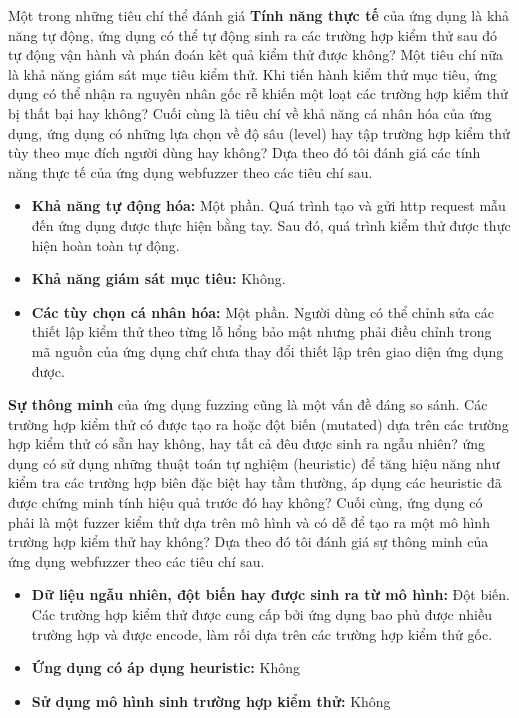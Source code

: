 Một trong những tiêu chí thể đánh giá \textbf{Tính năng thực tế} của ứng dụng là khả năng tự động, ứng dụng có thể tự động sinh ra các trường hợp kiểm thử sau đó tự động vận hành và phán đoán kêt quả kiểm thử được không? Một tiêu chí nữa là khả năng giám sát mục tiêu kiểm thử. Khi tiến hành kiểm thử mục tiêu, ứng dụng có thể nhận ra nguyên nhân gốc rễ khiến một loạt các trường hợp kiểm thử bị thất bại hay không? Cuối cùng là tiêu chí về khả năng cá nhân hóa của ứng dụng, ứng dụng có những lựa chọn về độ sâu (level) hay tập trường hợp kiểm thử tùy theo mục đích người dùng hay không? Dựa theo đó tôi đánh giá các tính năng thực tế của ứng dụng webfuzzer theo các tiêu chí sau.
\begin{itemize}
    \item \textbf{Khả năng tự động hóa:} Một phần. Quá trình tạo và gửi \acrshort{http} request mẫu đến ứng dụng được thực hiện bằng tay. Sau đó, quá trình kiểm thử được thực hiện hoàn toàn tự động.
    \item \textbf{Khả năng giám sát mục tiêu:} Không.
    \item \textbf{Các tùy chọn cá nhân hóa:} Một phần. Người dùng có thể chỉnh sửa các thiết lập kiểm thử theo từng lỗ hổng bảo mật nhưng phải điều chỉnh trong mã nguồn của ứng dụng chứ chưa thay đổi thiết lập trên giao diện ứng dụng được.
\end{itemize}
\textbf{Sự thông minh} của ứng dụng fuzzing cũng là một vấn đề đáng so sánh. Các trường hợp kiểm thử có được tạo ra hoặc đột biến (mutated) dựa trên các trường hợp kiểm thử có sẵn hay không, hay tất cả đêu được sinh ra ngẫu nhiên? ứng dụng có sử dụng những thuật toán tự nghiệm (heuristic) để tăng hiệu năng như kiểm tra các trường hợp biên đặc biệt hay tầm thường, áp dụng các heuristic đã được chứng minh tính hiệu quả trước đó hay không? Cuối cùng, ứng dụng có phải là một fuzzer kiểm thử dựa trên mô hình và có dễ để tạo ra một mô hình trường hợp kiểm thử hay không? Dựa theo đó tôi đánh giá sự thông minh của ứng dụng webfuzzer theo các tiêu chí sau.
\begin{itemize}
    \item \textbf{Dữ liệu ngẫu nhiên, đột biến hay được sinh ra từ mô hình:} Đột biến. Các trường hợp kiểm thử được cung cấp bởi ứng dụng bao phủ được nhiều trường hợp và được encode, làm rối dựa trên các trường hợp kiểm thử gốc.
    \item \textbf{Ứng dụng có áp dụng heuristic:} Không
    \item \textbf{Sử dụng mô hình sinh trường hợp kiểm thử:} Không
\end{itemize}
